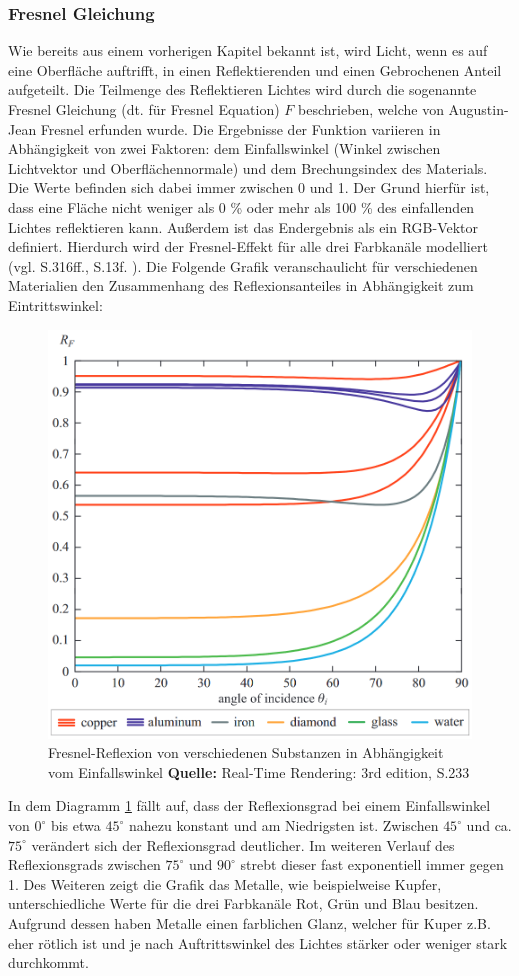 \documentclass[
  11pt,
  a4paper,
  oneside
  ]{article}
\begin{document}
\subsubsection{Fresnel Gleichung}\label{sec:fresnel}
Wie bereits aus einem vorherigen Kapitel bekannt ist, wird Licht, wenn es auf eine Oberfläche auftrifft, in einen Reflektierenden und einen Gebrochenen Anteil aufgeteilt. Die Teilmenge des Reflektieren Lichtes wird durch die sogenannte Fresnel Gleichung (dt. für Fresnel Equation) $F$ beschrieben, welche von Augustin-Jean Fresnel erfunden wurde. Die Ergebnisse der Funktion variieren in Abhängigkeit von zwei Faktoren: dem Einfallswinkel (Winkel zwischen Lichtvektor und Oberflächennormale) und dem Brechungsindex des Materials. Die Werte befinden sich dabei immer zwischen 0 und 1. Der Grund hierfür ist, dass eine Fläche nicht weniger als 0 \% oder mehr als 100 \% des einfallenden Lichtes reflektieren kann. Außerdem ist das Endergebnis als ein RGB-Vektor definiert. Hierdurch wird der Fresnel-Effekt für alle drei Farbkanäle modelliert 
(vgl. S.316ff.\cite{realTimeRendering4th}, S.13f. \cite{rtrPaper}). Die Folgende Grafik veranschaulicht für verschiedenen Materialien den Zusammenhang des Reflexionsanteiles in Abhängigkeit zum Eintrittswinkel:
\begin{figure}[H]
  \centering
  \includegraphics*[width=0.70 \textwidth]{images/fresnelDiagram.png}
  \caption{Fresnel-Reflexion von verschiedenen Substanzen in Abhängigkeit vom Einfallswinkel \footnotesize\textbf{Quelle:} Real-Time Rendering: 3rd edition, S.233 \cite{RTR3}}
  \label{fig:img5}
\end{figure}

In dem Diagramm \ref{fig:img5} fällt auf, dass der Reflexionsgrad bei einem Einfallswinkel von $0^\circ$ bis etwa $45^\circ$ nahezu konstant und am Niedrigsten ist. Zwischen $45^\circ$ und ca. $75^\circ$ verändert sich der Reflexionsgrad deutlicher. Im weiteren Verlauf des Reflexionsgrads zwischen $75^\circ$ und $90^\circ$ strebt dieser fast exponentiell immer gegen 1. Des Weiteren zeigt die Grafik das Metalle, wie beispielweise Kupfer, unterschiedliche Werte für die drei Farbkanäle Rot, Grün und Blau besitzen. Aufgrund dessen haben Metalle einen farblichen Glanz, welcher für Kuper z.B. eher rötlich ist und je nach Auftrittswinkel des Lichtes stärker oder weniger stark durchkommt. 
\end{document}
